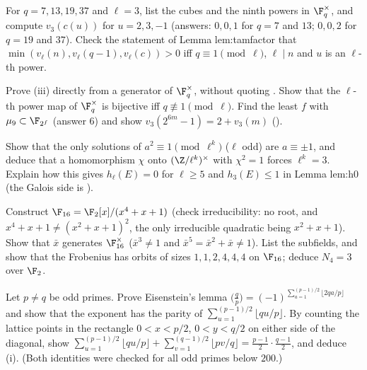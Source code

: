 \begin{exercise}\label{ex:rings:tamfactor}
For $q=7,13,19,37$ and $\ell=3$, list the cubes and the ninth powers in $\F_q^\times$, and compute $v_3(c(u))$ for $u=2,3,-1$ (answers: $0,0,1$ for $q=7$ and $13$; $0,0,2$ for
$q=19$ and $37$). Check the statement of Lemma lem:tamfactor that $\min(v_\ell(n),v_\ell(q-1),v_\ell(c))>0$ iff $q\equiv1\pmod\ell$, $\ell\mid n$ and $u$ is an $\ell$-th power.
\end{exercise}

\begin{exercise}\label{ex:rings:power-index}
Prove (iii) directly from a generator of $\F_q^\times$, without quoting . Show that the $\ell$-th power map of $\F_q^\times$ is
bijective iff $q\not\equiv1\pmod\ell$. Find the least $f$ with $\mu_9\subset\F_{2^f}$ (answer $6$) and show $v_3(2^{6m}-1)=2+v_3(m)$ ().
\end{exercise}

\begin{exercise}\label{ex:rings:h0}
Show that the only solutions of $a^2\equiv1\pmod{\ell^k}$ ($\ell$ odd) are $a\equiv\pm1$, and deduce that a homomorphism $\chi$ onto $(\Z/\ell^k)^\times$ with $\chi^2=1$ forces
$\ell^k=3$. Explain how this gives $h_\ell(E)=0$ for $\ell\ge5$ and $h_3(E)\le1$ in Lemma lem:h0 (the Galois side is ).
\end{exercise}

\begin{exercise}\label{ex:rings:f16}
Construct $\F_{16}=\F_2[x]/(x^4+x+1)$ (check irreducibility: no root, and $x^4+x+1\ne(x^2+x+1)^2$, the only irreducible quadratic being $x^2+x+1$). Show
that $\bar x$ generates $\F_{16}^\times$ ($\bar x^3\ne1$ and $\bar x^5=\bar x^2+\bar x\ne1$). List the subfields, and show that the Frobenius has orbits of sizes $1,1,2,4,4,4$ on
$\F_{16}$; deduce $N_4=3$ over $\F_2$.
\end{exercise}

\begin{exercise}\label{ex:rings:eisenstein-lemma}
Let $p\ne q$ be odd primes. Prove Eisenstein's lemma $\bigl(\frac qp\bigr)=(-1)^{\sum_{a=1}^{(p-1)/2}\lfloor2qa/p\rfloor}$ and show that the exponent has the parity of
$\sum_{u=1}^{(p-1)/2}\lfloor qu/p\rfloor$. By counting the lattice points in the rectangle $0<x<p/2$, $0<y<q/2$ on either side of the diagonal, show
$\sum_{u=1}^{(p-1)/2}\lfloor qu/p\rfloor+\sum_{v=1}^{(q-1)/2}\lfloor pv/q\rfloor=\frac{p-1}2\cdot\frac{q-1}2$, and deduce (i). (Both identities were checked for all
odd primes below $200$.)
\end{exercise}

